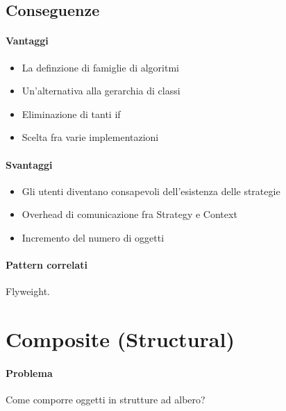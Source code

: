 \subsection*{Conseguenze}
\paragraph*{Vantaggi}
\begin{itemize}
    \item La definzione di famiglie di algoritmi
    \item Un'alternativa alla gerarchia di classi
    \item Eliminazione di tanti if
    \item Scelta fra varie implementazioni
\end{itemize}
\paragraph*{Svantaggi}
\begin{itemize}
    \item Gli utenti diventano consapevoli dell'esistenza delle strategie
    \item Overhead di comunicazione fra Strategy e Context
    \item Incremento del numero di oggetti
\end{itemize}
\paragraph*{Pattern correlati} Flyweight.
\section{Composite (Structural)}
\paragraph*{Problema} Come comporre oggetti in strutture ad albero?
